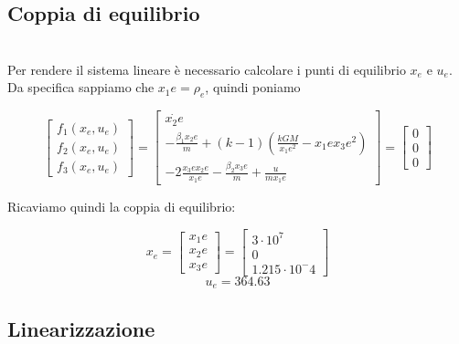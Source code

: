 \documentclass{article}
\begin{document}
\subsection{Coppia di equilibrio}\\
Per rendere il sistema lineare è necessario calcolare i punti di equilibrio $x_e$ e $u_e$.\\
Da specifica sappiamo che $x_1e=\rho_e$, quindi poniamo
\begin{large}
\begin{equation}
\begin{bmatrix} f_1(x_e,u_e) \\ f_2(x_e,u_e) \\ f_3(x_e,u_e)\end{bmatrix} =
\begin{bmatrix} \dot{x_2e} \\
-\frac{\beta_1 x_2e}{m} + (k-1)(\frac{kG M}{x_1e^2} - x_1e x_3e^2) \\ 
-2\frac{x_3e x_2e}{x_1e} - \frac{\beta_2 x_3e}{m} + \frac{u}{m x_1e}  \end{bmatrix} =
\begin{bmatrix} 0 \\ 0 \\ 0\end{bmatrix}
\end{equation}
\end{large}
Ricaviamo quindi la coppia di equilibrio:
\begin{large}
\begin{equation}
x_e=\begin{bmatrix} x_1e \\ x_2e \\ x_3e\end{bmatrix}=
\begin{bmatrix} 3\cdot10^7 \\ 0 \\ 1.215\cdot10^-4\end{bmatrix}
\end{equation}
\begin{equation}
u_e=364.63
\end{equation}
\end{large}


\subsection{Linearizzazione}
\end{document}
